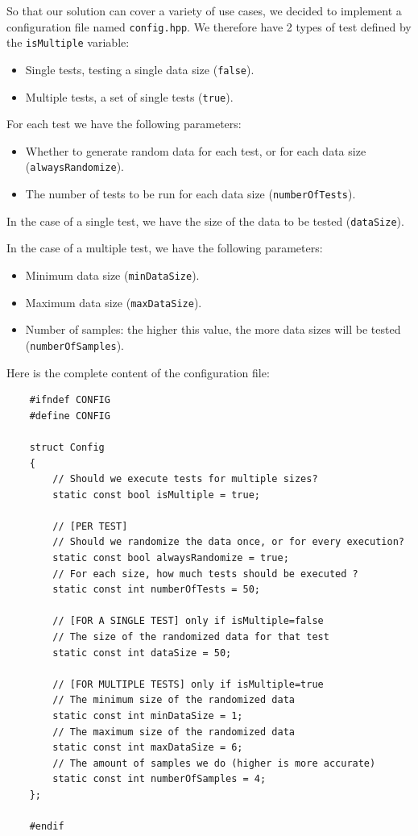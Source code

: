\documentclass[conference]{IEEEtran}
\def\code#1{\texttt{#1}}
\begin{document}
So that our solution can cover a variety of use cases, we decided to implement a configuration file named \code{config.hpp}.
We therefore have 2 types of test defined by the \code{isMultiple} variable:
\begin{itemize}
	\item Single tests, testing a single data size (\code{false}).
	\item Multiple tests, a set of single tests (\code{true}).
\end{itemize}

For each test we have the following parameters:
\begin{itemize}
	\item Whether to generate random data for each test, or for each data size (\code{alwaysRandomize}).
	\item The number of tests to be run for each data size (\code{numberOfTests}).
\end{itemize}

In the case of a single test, we have the size of the data to be tested (\code{dataSize}).

In the case of a multiple test, we have the following parameters:
\begin{itemize}
	\item Minimum data size (\code{minDataSize}).
	\item Maximum data size (\code{maxDataSize}).
	\item Number of samples: the higher this value, the more data sizes will be tested (\code{numberOfSamples}).
\end{itemize}

Here is the complete content of the configuration file:
\begin{lstlisting}
	#ifndef CONFIG
	#define CONFIG
	
	struct Config
	{
		// Should we execute tests for multiple sizes?
		static const bool isMultiple = true;
		
		// [PER TEST]
		// Should we randomize the data once, or for every execution?
		static const bool alwaysRandomize = true;
		// For each size, how much tests should be executed ?
		static const int numberOfTests = 50;
		
		// [FOR A SINGLE TEST] only if isMultiple=false
		// The size of the randomized data for that test
		static const int dataSize = 50;
		
		// [FOR MULTIPLE TESTS] only if isMultiple=true
		// The minimum size of the randomized data
		static const int minDataSize = 1;
		// The maximum size of the randomized data
		static const int maxDataSize = 6;
		// The amount of samples we do (higher is more accurate)
		static const int numberOfSamples = 4;
	};
	
	#endif
\end{lstlisting}
\end{document}
